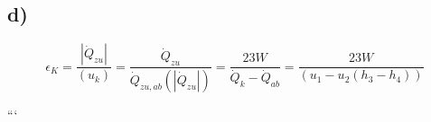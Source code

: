 

\subsection*{d)}

\[
\epsilon_{K} = \frac{|\dot{Q}_{zu}|}{(u_{k})} = \frac{\dot{Q}_{zu}}{\dot{Q}_{zu,ab} (|\dot{Q}_{zu}|)} = \frac{23 W}{\dot{Q}_{k} - \dot{Q}_{ab}} = \frac{23 W}{(u_{1} - u_{2} (h_{3} - h_{4}))}
\]

```